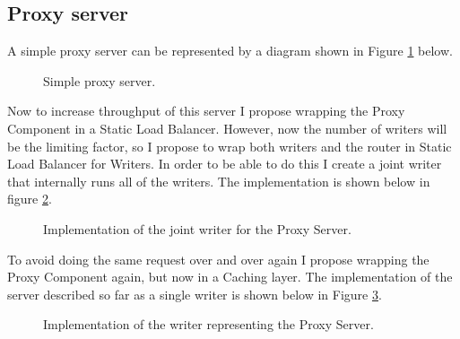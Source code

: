 \subsection{Proxy server}
A simple proxy server can be represented by a diagram shown in Figure
\ref{fig:proxyServer} below.
\begin{figure}[h]
\centering
{}
\caption[scale=1.0]{Simple proxy server.}
\label{fig:proxyServer}
\end{figure}

Now to increase throughput of this server I propose wrapping the Proxy
Component in a Static Load Balancer. However, now the number of writers
will be the limiting factor, so I propose to wrap both writers and 
the router in Static Load Balancer for Writers. In order to be able 
to do this I create a joint writer that internally runs all of the writers.
The implementation is shown below in figure \ref{fig:ProxyWriters}.
\begin{figure}[h]
  
\caption[scale=1.0]{Implementation of the joint writer for the Proxy Server.}
\label{fig:ProxyWriters}
\end{figure}

To avoid doing the same request over and over again I propose
wrapping the Proxy Component again, but now in a Caching layer. The 
implementation of the server described so far as a single writer is shown
below in Figure \ref{fig:ProxyWriter}.
\begin{figure}[h]
 
\caption[scale=1.0]{Implementation of the writer representing the Proxy Server.}
\label{fig:ProxyWriter}
\end{figure}

